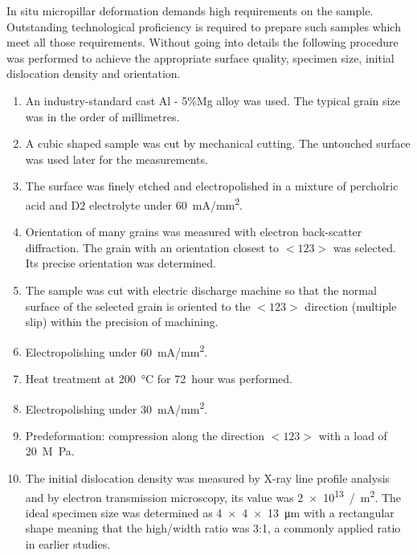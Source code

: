 In situ micropillar deformation demands high requirements on the sample. Outstanding technological proficiency is required to prepare such samples which meet all those requirements. Without going into details the following procedure was performed to achieve the appropriate surface quality, specimen size, initial dislocation density and orientation.
\begin{enumerate}
\item An industry-standard cast Al - 5\%Mg alloy was used. The typical grain size was in the order of millimetres.
\item A cubic shaped sample was cut by mechanical cutting. The untouched surface was used later for the measurements.
\item The surface was finely etched and electropolished in a mixture of percholric acid and D2 electrolyte under \SI{60}{mA/mm^2}.
\item Orientation of many grains was measured with electron back-scatter diffraction. The grain with an orientation closest to $<123>$ was selected. Its precise orientation was determined.
\item The sample was cut with electric discharge machine so that the normal surface of the selected grain is oriented to the $<123>$ direction (multiple slip) within the precision of machining.
\item Electropolishing under \SI{60}{mA/mm^2}.
\item Heat treatment at \SI{200}{\celsius} for \SI{72}{hour} was performed.
\item Electropolishing under \SI{30}{mA/mm^2}.
\item Predeformation: compression along the direction $<123>$ with a load of \SI{20}{M\pascal}.
\item The initial dislocation density was measured by X-ray line profile analysis and by electron transmission microscopy, its value was \SI[exponent-product = \cdot]{2e13}{/m^2}. The ideal specimen size was determined as \SI{4 x 4 x 13}{\micro\meter} with a rectangular shape meaning that the high/width ratio was 3:1, a commonly applied ratio in earlier studies.
\end{enumerate}

